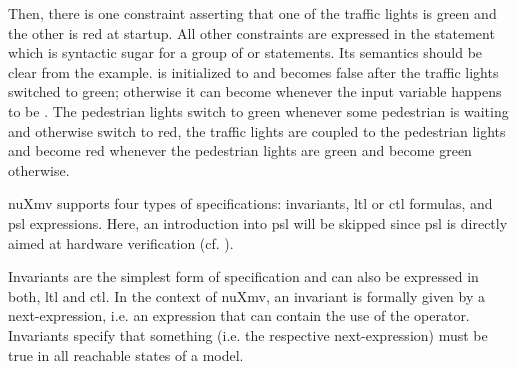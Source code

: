 \begin{example}
    Then, there is one  constraint asserting that one of the traffic lights is green and the other is red at startup.
    All other constraints are expressed in the  statement which is syntactic sugar for a group of  or  statements.
    Its semantics should be clear from the example.
     is initialized to  and becomes false after the traffic lights switched to green; otherwise it can become  whenever the input variable  happens to be .
    The pedestrian lights switch to green whenever some pedestrian is waiting and otherwise switch to red, the traffic lights are coupled to the pedestrian lights and become red whenever the pedestrian lights are green and become green otherwise.
\end{example}

nuXmv supports four types of specifications: invariants, \gls{ltl} or \gls{ctl} formulas, and \gls{psl} expressions.
Here, an introduction into \gls{psl} will be skipped since \gls{psl} is directly aimed at hardware verification (cf. \cite{Foster05}).

Invariants are the simplest form of specification and can also be expressed in both, \gls{ltl} and \gls{ctl}.
In the context of nuXmv, an invariant is formally given by a next-expression, i.e. an expression that can contain the use of the  operator.
Invariants specify that something (i.e. the respective next-expression) must be true in all reachable states of a model.

